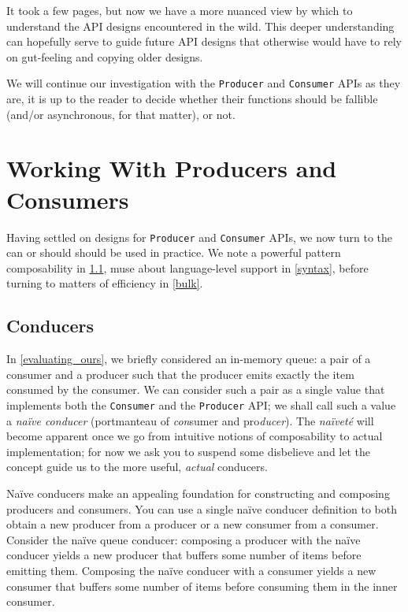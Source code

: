 \documentclass[sigplan,screen,10pt,anonymous,review]{acmart}
\begin{document}
It took a few pages, but now we have a more nuanced view by which to understand the API designs encountered in the wild. This deeper understanding can hopefully serve to guide future API designs that otherwise would have to rely on gut-feeling and copying older designs.

We will continue our investigation with the \texttt{Producer} and \texttt{Consumer} APIs as they are, it is up to the reader to decide whether their functions should be fallible (and/or asynchronous, for that matter), or not.

\section{Working With Producers and Consumers}

Having settled on designs for \texttt{Producer} and \texttt{Consumer} APIs, we now turn to the can or should should be used in practice. We note a powerful pattern composability in \cref{conducer}, muse about language-level support in \cref{syntax}, before turning to matters of efficiency in \cref{bulk}.

\subsection{Conducers}\label{conducer}

In \cref{evaluating_ours}, we briefly considered an in-memory queue: a pair of a consumer and a producer such that the producer emits exactly the item consumed by the consumer. We can consider such a pair as a single value that implements both the \texttt{Consumer} and the \texttt{Producer} API; we shall call such a value a \textit{naïve conducer} (portmanteau of \textit{con}sumer and pro\textit{ducer}). The \textit{naïveté} will become apparent once we go from intuitive notions of composability to actual implementation; for now we ask you to suspend some disbelieve and let the concept guide us to the more useful, \textit{actual} conducers.

Naïve conducers make an appealing foundation for constructing and composing producers and consumers. You can use a single naïve conducer definition to both obtain a new producer from a producer or a new consumer from a consumer. Consider the naïve queue conducer: composing a producer with the naïve conducer yields a new producer that buffers some number of items before emitting them. Composing the naïve conducer with a consumer yields a new consumer that buffers some number of items before consuming them in the inner consumer.
\end{document}
